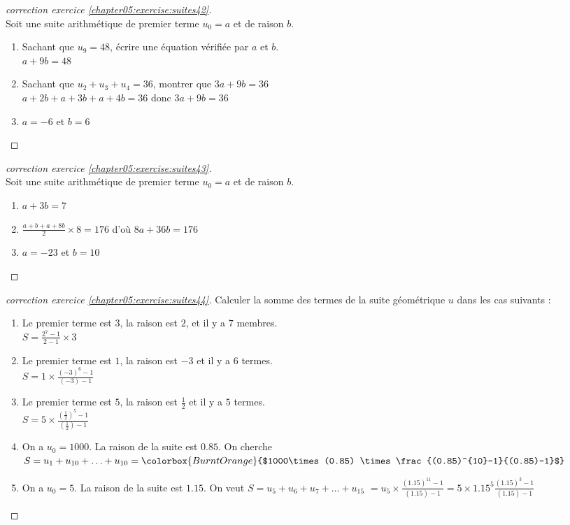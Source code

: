 \documentclass[main.tex]{subfiles}
\begin{document}
\begin{proof}[correction exercice \ref{chapter05:exercise:suites42}] \hfill  \\
	Soit une suite arithmétique de premier terme  $u_0=a$ et de raison $b$. 
	\begin{enumerate}[leftmargin=*,label=\arabic*)]
		\item Sachant que $u_9=48$, écrire une équation vérifiée par $a$ et $b$.\\
		\colorbox{BurntOrange}{$a+9b=48$}
		\item Sachant que  $u_2+u_3+u_4=36$, montrer que $3a+9b =36$\\
		\colorbox{BurntOrange}{$a+2b+a+3b+a+4b=36$ donc $3a+9b=36$}
		\item \colorbox{BurntOrange}{$a=-6$ et $b=6$}
	\end{enumerate}
\end{proof} 
\begin{proof}[correction exercice \ref{chapter05:exercise:suites43}]\hfill  \\
Soit une suite arithmétique de premier terme $u_0=a$ et de raison $b$.
	\begin{enumerate}[leftmargin=*,label=\arabic*)]
	\item  
	\colorbox{BurntOrange}{$a+3b=7$}
	\item 
	\colorbox{BurntOrange}{$\frac{a+b+a+8b}{2}\times 8=176$ d'où $8a+36b=176$}
	\item \colorbox{BurntOrange}{$a=-23$ et $b=10$}
\end{enumerate}
\end{proof}
%	 
\begin{proof}[correction exercice \ref{chapter05:exercise:suites44}] Calculer la somme des termes de la suite géométrique $u$ dans les cas suivants :
	\begin{enumerate}[leftmargin=*,label=\arabic*)]
		\item Le premier terme est $3$, la raison est $2$, et il y a $7$ membres.\\
		\colorbox{BurntOrange}{$S=\frac{2^7-1}{2-1}\times 3$}
		\item Le premier terme est $1$, la raison est $-3$ et il y a $6$ termes.\\
		\colorbox{BurntOrange}{$S=1\times \frac{(-3)^6-1}{(-3)-1}$}
		\item Le premier terme est $5$, la raison est $\tfrac{1}{2}$ et il y a $5$ termes.\\
		\colorbox{BurntOrange}{$S=5\times \frac{(\tfrac{1}{2})^5-1}{(\tfrac{1}{2})-1}$}
		\item On a $u_0=1000$. La raison de la suite est $0.85$. On cherche $S=u_1+ u_{10}+\ldots+u_{10}=\colorbox{BurntOrange}{$1000\times(0.85) \times  \frac{(0.85)^{10}-1}{(0.85)-1}$}$ 
		\item On a $u_0=5$. La raison de la suite est $1.15$. On veut $S=u_5+u_6+u_{7}+\ldots+u_{15}$ 
		\colorbox{BurntOrange}{$=u_5\times \frac{(1.15)^{11}-1}{(1.15)-1}=5\times 1.15^5\frac{(1.15)^{3}-1}{(1.15)-1} $} 
	\end{enumerate} 
\end{proof}
\end{document}

